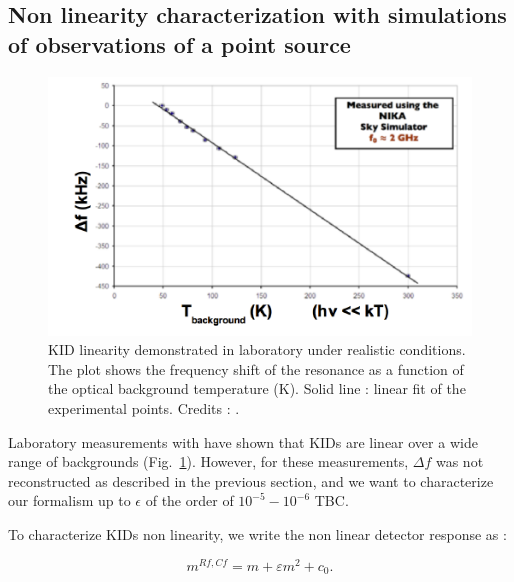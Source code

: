 
\subsection{Non linearity characterization with simulations of observations of a point source}

\begin{figure}
\center
\includegraphics[clip, angle=0, width=\columnwidth]{Figures/KID-linearity-Monfardini2014.png}
\caption{KID linearity demonstrated in laboratory under realistic
  conditions. The plot shows the frequency shift of the resonance as a function
  of the optical background temperature (K). Solid line : linear fit of the
  experimental points. Credits : \citet{2014JLTP..176..787M}.}
\label{fig:KID-lin}
\end{figure}

Laboratory measurements with  have shown that
KIDs are linear over a wide range of backgrounds
(Fig.~\ref{fig:KID-lin}). However, for these measurements, $\Delta f$ was not
reconstructed as described in the previous section, and we want to characterize
our formalism up to $\epsilon$ of the order of $10^{-5}-10^{-6} $ TBC.

To characterize KIDs non linearity, we write the non linear detector response as :

\begin{equation}
m^{Rf,Cf} = m + \varepsilon m^2 +c_{0}.
\label{eq:model_kid_nl}
\end{equation}

